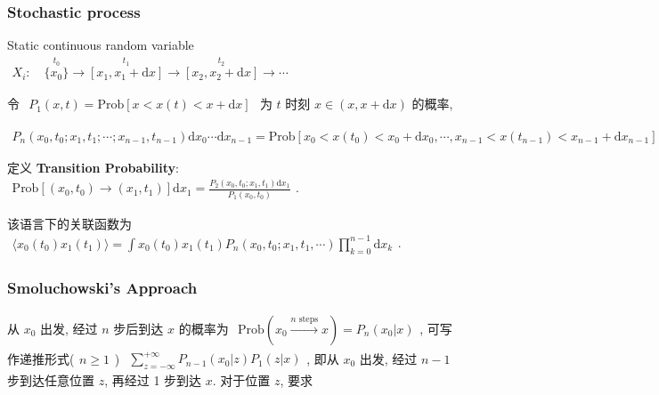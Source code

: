 \documentclass[../../main.tex]{subfiles}
\begin{document}
\subsubsection{Stochastic process} 

Static continuous random variable $\begin{aligned}
    X_{i}:\quad\stackrel{t_{0}}{\{x_{0}\}}\rightarrow \stackrel{t_{1}}{[x_{1},x_{1}+\mathrm{d}x]}\rightarrow  \stackrel{t_{2}}{[x_{2},x_{2}+\mathrm{d}x]}\rightarrow \cdots
\end{aligned}$

令 $\begin{aligned}
    P_{1}(x,t) = \text{Prob}\left[
        x<x(t)<x+\mathrm{d}x
    \right]
\end{aligned}$ 为 $t$ 时刻 $x\in(x,x+\mathrm{d}x)$ 的概率, 

$\begin{aligned}
    P_{n}(x_{0},t_{0};x_{1},t_{1};\cdots;x_{n-1},t_{n-1})\mathrm{d}x_{0}\cdots\mathrm{d}x_{n-1} = \text{Prob}\left[
    x_{0}<x(t_{0})<x_{0}+\mathrm{d}x_{0},\cdots,x_{n-1}<x(t_{n-1})<x_{n-1}+\mathrm{d}x_{n-1}
    \right]
\end{aligned}$


定义 \textbf{Transition Probability}: $\begin{aligned}
    \text{Prob}\left[(x_{0},t_{0})\rightarrow(x_{1},t_{1})\right]\mathrm{d}x_{1} = \frac{P_{2}(x_{0},t_{0};x_{1},t_{1})\mathrm{d}x_{1}}{P_{1}(x_{0},t_{0})}
\end{aligned}$. 

该语言下的关联函数为 $\begin{aligned}
    \langle x_{0}(t_{0})x_{1}(t_{1})\rangle = \int
    x_{0}(t_{0})x_{1}(t_{1})P_{n}(x_{0},t_{0};x_{1},t_{1},\cdots)\prod_{k=0}^{n-1}\mathrm{d}x_{k}
\end{aligned}$. 

\subsubsection{Smoluchowski's Approach} 

从 $x_{0}$ 出发, 经过 $n$ 步后到达 $x$ 的概率为 $\begin{aligned}
    \text{Prob}\left(x_{0}\stackrel{n\text{ steps}}{\longrightarrow} x\right) = P_{n}(x_{0}|x)
\end{aligned}$, 可写作递推形式($\begin{aligned}
    n\geq 1
\end{aligned}$) $\begin{aligned}
    \sum_{z=-\infty}^{+\infty}P_{n-1}(x_{0}|z)P_{1}(z|x)
\end{aligned}$, 即从 $x_{0}$ 出发, 经过 $n-1$ 步到达任意位置 $z$, 再经过 1 步到达 $x$. 对于位置 $z$, 要求 
\end{document}

